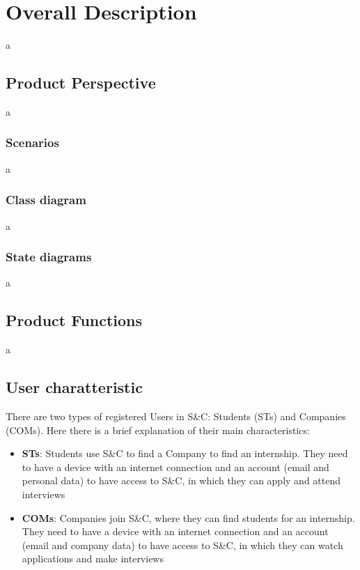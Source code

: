 \chapter{Overall Description}
a

\section{Product Perspective}
a

\subsection{Scenarios}
a

\subsection{Class diagram}
a

\subsection{State diagrams}
a

\section{Product Functions}
a


\section{User charatteristic}
There are two types of registered Users in S\&C: Students (STs) and Companies (COMs).
Here there is a brief explanation of their main characteristics:

\begin{itemize}
    \item \textbf{STs}: Students use S\&C to find a Company to find an internship. 
    They need to have a device with an internet connection
    and an account (email and personal data) to have access to  S\&C,
    in which they can apply and attend interviews
    
    \item \textbf{COMs}: Companies join S\&C, where they can find students for an internship.
    They need to have a device with an internet connection
    and an account (email and company data) to have access to  S\&C,
    in which they can watch applications and make interviews
    
\end{itemize}

